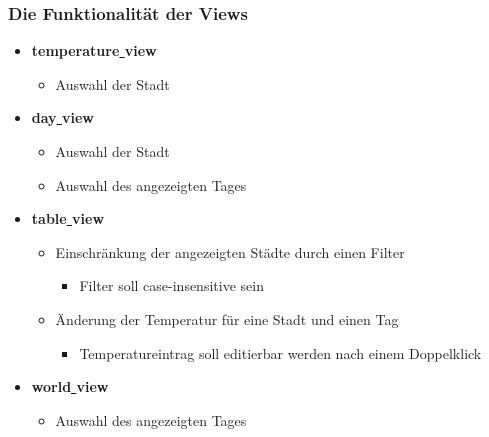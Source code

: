 \begin{frame}
  \frametitle{Die Funktionalit\"at der Views}
  \begin{itemize}
    \item \textbf{temperature\underline{ }view}
    \begin{itemize}
      \item Auswahl der Stadt
    \end{itemize}
    \item \textbf{day\underline{ }view}
    \begin{itemize}
      \item Auswahl der Stadt
      \item Auswahl des angezeigten Tages
    \end{itemize}
    \item \textbf{table\underline{ }view}
    \begin{itemize}
      \item Einschr\"ankung der angezeigten St\"adte durch einen Filter
      \begin{itemize}
        \item Filter soll case-insensitive sein
      \end{itemize}
      \item \"Anderung der Temperatur f\"ur eine Stadt und einen Tag
      \begin{itemize}
        \item Temperatureintrag soll editierbar werden nach einem Doppelklick
      \end{itemize}
    \end{itemize}
    \item \textbf{world\underline{ }view}
    \begin{itemize}
      \item Auswahl des angezeigten Tages
    \end{itemize}
  \end{itemize}
\end{frame}